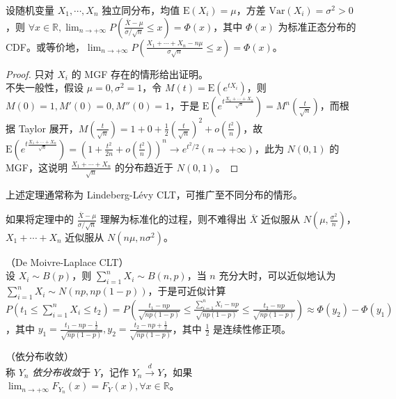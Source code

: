 \documentclass[../main.tex]{subfiles}
\begin{document}
\begin{theorem}\label{thm:5.3.1}
    设随机变量 $X_1,\cdots,X_n$ 独立同分布，均值 $\mathrm E(X_i)=\mu$，方差 $\mathrm{Var}(X_i)=\sigma^2>0$，则 $\forall x\in\mathbb R,\lim_{n\rightarrow+\infty}P\left(\frac{\bar X-\mu}{\sigma/\sqrt n}\leq x\right)=\Phi(x)$，其中 $\Phi(x)$ 为标准正态分布的 CDF。或等价地，$\lim_{n\rightarrow+\infty}P\left(\frac{X_1+\cdots+X_n-n\mu}{\sigma\sqrt n}\leq x\right)=\Phi(x)$。
\end{theorem}

\begin{proof}
    只对 $X_i$ 的 MGF 存在的情形给出证明。\\
    不失一般性，假设 $\mu=0,\sigma^2=1$，令 $M(t)=\mathrm E(e^{tX_i})$，则 $M(0)=1,M'(0)=0,M''(0)=1$，于是 $\mathrm E(e^{t\frac{X_1+\cdots+X_n}{\sqrt n}})=M^n\left(\frac t{\sqrt n}\right)$，而根据 Taylor 展开，$M\left(\frac t{\sqrt n}\right)=1+0+\frac12\left(\frac t{\sqrt n}\right)^2+o\left(\frac{t^2}n\right)$，故 $\mathrm E(e^{t\frac{X_1+\cdots+X_n}{\sqrt n}})=(1+\frac{t^2}{2n}+o(\frac{t^2} n))^n\rightarrow e^{t^2/2}(n\rightarrow+\infty)$，此为 $N(0,1)$ 的 MGF，这说明 $\frac{X_1+\cdots+X_n}{\sqrt n}$ 的分布趋近于 $N(0,1)$。
\end{proof}

上述定理通常称为 Lindeberg-Lévy CLT，可推广至不同分布的情形。

如果将定理中的 $\frac{\bar X-\mu}{\sigma/\sqrt n}$ 理解为标准化的过程，则不难得出 $\bar X$ 近似服从 $N(\mu,\frac{\sigma^2}n)$，$X_1+\cdots+X_n$ 近似服从 $N(n\mu,n\sigma^2)$。

\begin{example}
    （De Moivre-Laplace CLT）\\
    设 $X_i\sim B(p)$，则 $\sum_{i=1}^nX_i\sim B(n,p)$，当 $n$ 充分大时，可以近似地认为 $\sum_{i=1}^nX_i\sim N(np,np(1-p))$，于是可近似计算 $P(t_1\leq \sum_{i=1}^nX_i\leq t_2)=P\left(\frac{t_1-np}{\sqrt{np(1-p)}}\leq\frac{\sum_{i=1}^nX_i-np}{\sqrt{np(1-p)}}\leq\frac{t_2-np}{\sqrt{np(1-p)}}\right)\approx \Phi(y_2)-\Phi(y_1)$，其中 $y_1=\frac{t_1-np-\frac12}{\sqrt{np(1-p)}},y_2=\frac{t_2-np+\frac12}{\sqrt{np(1-p)}}$，其中 $\frac12$ 是连续性修正项。
\end{example}

\begin{definition}\label{def:5.3.1}
    （依分布收敛）\\
    称 $Y_n$ \emph{依分布收敛}于 $Y$，记作 $Y_n\overset{d}\rightarrow Y$，如果 $\lim_{n\rightarrow+\infty}F_{Y_n}(x)=F_Y(x),\forall x\in\mathbb R$。
\end{definition}
\end{document}
